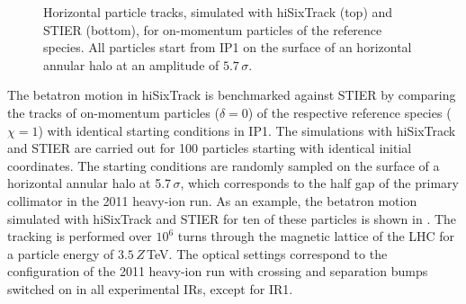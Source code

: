 \begin{figure}[t]
  \centering
  \caption{Horizontal particle tracks, simulated with hiSixTrack (top) and STIER (bottom), for on-momentum particles of the reference species. All particles start from IP1 on the surface of an horizontal annular halo at an amplitude of $5.7\,\sigma$.}  
  \label{pic:16042801}
  \end{figure}






The betatron motion in hiSixTrack is benchmarked against STIER by comparing the tracks of on-momentum particles ($\delta = 0$) of the respective reference species ($\chi=1$) with identical starting conditions in IP1. The simulations with hiSixTrack and STIER are carried out for 100 particles starting with identical initial coordinates. The starting conditions are randomly sampled on the surface of a horizontal annular halo at 5.7$\,\sigma$, which corresponds to the half gap of the primary collimator in the 2011 heavy-ion run.  As an example, the betatron motion simulated with hiSixTrack and STIER for ten of these particles is shown in . 
\newpage
The tracking is performed over $10^6$ turns through the magnetic lattice of the LHC for a particle energy of $3.5\,Z\,$TeV. The optical settings correspond to the configuration of the 2011 heavy-ion run with crossing and separation bumps switched on in all experimental IRs, except for IR1. 

